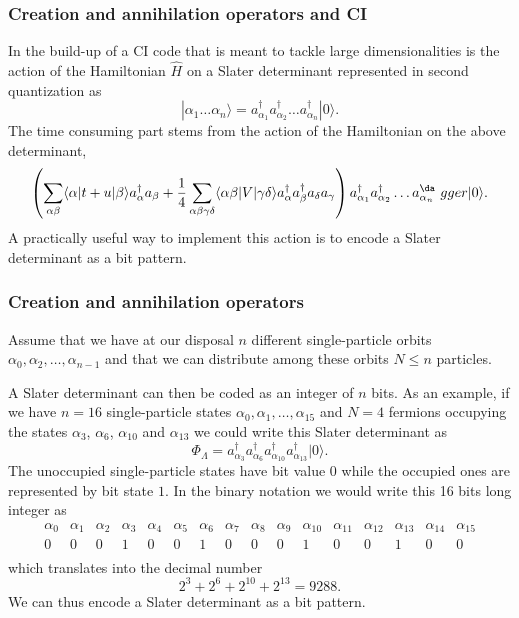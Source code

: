 \documentclass[compress]{beamer}
\newcommand*{\ket}[1]{|#1\rangle}
\newcommand*{\bra}[1]{\langle#1|}
\newcommand{\element}[3]
        {\bra{#1}#2\ket{#3}}
\begin{document}
\frame
{
  \frametitle{Creation and annihilation operators and CI }
\begin{small}
{\scriptsize
In the build-up of a CI code that is meant to tackle large dimensionalities
is the action of the Hamiltonian $\hat{H}$ on a
Slater determinant represented in second quantization as
\[
\ket{\alpha_1\dots \alpha_n} = a_{\alpha_1}^\dagger a_{\alpha_2}^\dagger \dots a_{\alpha_n}^\dagger \ket{0}.
\]
The time consuming part stems from the action of the Hamiltonian
on the above determinant,
\[
\left(\sum_{\alpha\beta} \element{\alpha}{t+u}{\beta} a_\alpha^\dagger a_\beta + \frac{1}{4} \sum_{\alpha\beta\gamma\delta}
                \element{\alpha \beta}{V}{\gamma \delta} a_\alpha^\dagger a_\beta^\dagger a_\delta a_\gamma\right)a_{\alpha_1}^\dagger a_{\alpha_2}^\dagger \dots a_{\alpha_n}^\da\
gger \ket{0}.
\]
A practically useful way to implement this action is to encode a Slater determinant as a bit pattern.
}
\end{small}
}

\frame
{
  \frametitle{Creation and annihilation operators}
\begin{small}
{\scriptsize
Assume that we have at our disposal $n$ different single-particle orbits
$\alpha_0,\alpha_2,\dots,\alpha_{n-1}$ and that we can distribute  among these orbits $N\le n$ particles.

A Slater  determinant can then be coded as an integer of $n$ bits. As an example, if we have $n=16$ single-particle states
$\alpha_0,\alpha_1,\dots,\alpha_{15}$ and $N=4$ fermions occupying the states $\alpha_3$, $\alpha_6$, $\alpha_{10}$ and $\alpha_{13}$
we could write this Slater determinant as  
\[
\Phi_{\Lambda} = a_{\alpha_3}^\dagger a_{\alpha_6}^\dagger a_{\alpha_{10}}^\dagger a_{\alpha_{13}}^\dagger \ket{0}.
\]
The unoccupied single-particle states have bit value $0$ while the occupied ones are represented by bit state $1$. 
In the binary notation we would write this   16 bits long integer as
\[
\begin{array}{cccccccccccccccc}
{\alpha_0}&{\alpha_1}&{\alpha_2}&{\alpha_3}&{\alpha_4}&{\alpha_5}&{\alpha_6}&{\alpha_7} & {\alpha_8} &{\alpha_9} & {\alpha_{10}} &{\alpha_{11}} &{\alpha_{12}} &{\alpha_{13}} &{\alpha_{14}} & {\alpha_{15}} \\
{0} & {0} &{0} &{1} &{0} &{0} &{1} &{0} &{0} &{0} &{1} &{0} &{0} &{1} &{0} & {0} \\
\end{array}
\]
which translates into the decimal number
\[
2^3+2^6+2^{10}+2^{13}=9288.
\]
We can thus encode a Slater determinant as a bit pattern.
}
\end{small}
}
\end{document}
